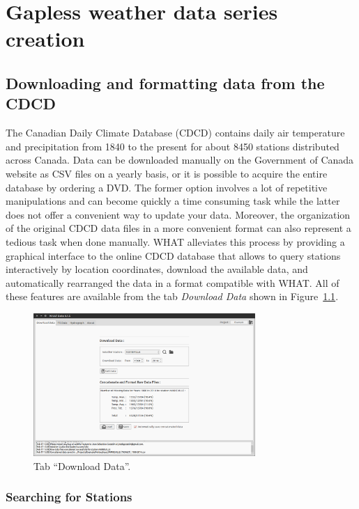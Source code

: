 \documentclass[WHATMANUAL.tex]{subfiles}
\begin{document}
\chapter{Gapless weather data series creation}

\section{Downloading and formatting data from the CDCD}

The Canadian Daily Climate Database (CDCD) contains daily air temperature and precipitation from 1840 to the present for about 8450 stations distributed across Canada. Data can be downloaded manually on the Government of Canada website as CSV files on a yearly basis, or it is possible to acquire the entire database by ordering a DVD. The former option involves a lot of repetitive manipulations and can become quickly a time consuming task while the latter does not offer a convenient way to update your data. Moreover, the organization of the original CDCD data files in a more convenient format can also represent a tedious task when done manually. WHAT alleviates this process by providing a graphical interface to the online CDCD database that allows to query stations interactively by location coordinates, download the available data, and automatically rearranged the data in a format compatible with WHAT. All of these features are available from the tab \emph{Download Data} shown in Figure~\ref{fig:tab_dwnldData}.

\begin{figure}[!ht]
\centering
\includegraphics[width=0.75\textwidth]{img/WHAT_Screenshot000}
\caption[Tab ``Download Data''.]{Tab ``Download Data''.}
\label{fig:tab_dwnldData}
\end{figure}

\subsection{Searching for Stations}
\end{document}

